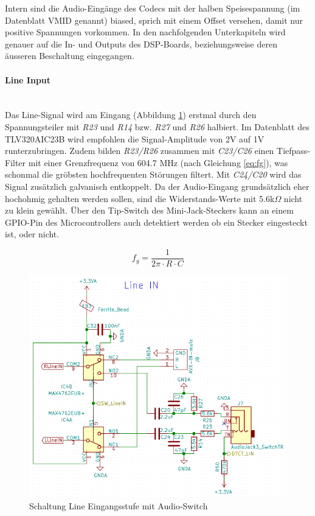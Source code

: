 Intern sind die Audio-Eingänge des Codecs mit der halben Speisespannung (im Datenblatt VMID genannt) biased, sprich mit einem Offset versehen, damit nur positive Spannungen vorkommen.
In den nachfolgenden Unterkapiteln wird genauer auf die In- und Outputs des DSP-Boards, beziehungsweise deren äusseren Beschaltung eingegangen.
\\
\paragraph{Line Input}\vspace{-0.3cm}\\
\label{par:LineIN}
Das Line-Signal wird am Eingang (Abbildung \ref{fig:Schema_LineIN}) erstmal durch den Spannungsteiler mit \textit{R23} und \textit{R14} bzw. \textit{R27} und \textit{R26} halbiert. Im Datenblatt des TLV320AIC23B \cite{tlv320} wird empfohlen die Signal-Amplitude von 2V auf 1V runterzubringen. Zudem bilden \textit{R23/R26} zusammen mit \textit{C23/C26}  einen Tiefpass-Filter mit einer Grenzfrequenz von 604.7 MHz (nach Gleichung \ref{eq:fg}), was schonmal die gröbsten hochfrequenten Störungen filtert. Mit \textit{C24/C20} wird das Signal zusätzlich galvanisch entkoppelt. Da der Audio-Eingang grundsätzlich eher hochohmig gehalten werden sollen, sind die Widerstands-Werte mit 5.6k$\Omega$ nicht zu klein gewählt. \cite{book:douglas}
Über den Tip-Switch des Mini-Jack-Steckers kann an einem GPIO-Pin des Microcontrollers auch detektiert werden ob ein Stecker eingesteckt ist, oder nicht.

\begin{equation}
f_g=\frac{1}{2\pi \cdot R \cdot C}
\label{eq:fg}
\end{equation}

\begin{figure} [H]
\begin{center}
 \includegraphics[scale=0.6]{../graphics/Schema_LineIN.png}
\caption{Schaltung Line Eingangsstufe mit Audio-Switch}
\label{fig:Schema_LineIN}
\end{center}
\end{figure}

